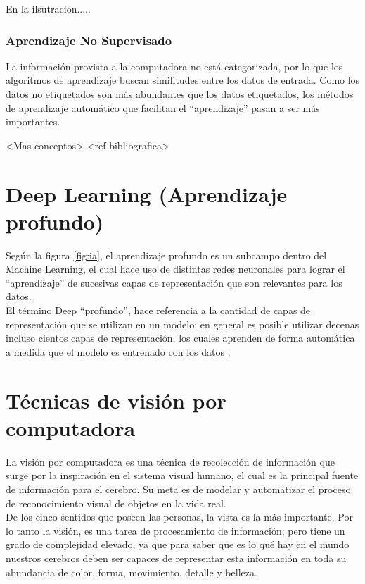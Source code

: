 En la ilsutracion.....

\subsubsection{Aprendizaje No Supervisado}
La información provista a la computadora no está categorizada, por lo que los algoritmos de aprendizaje buscan similitudes entre los datos de entrada. Como los datos no etiquetados son más abundantes que los datos etiquetados, los métodos de aprendizaje automático que facilitan el ``aprendizaje'' pasan a ser más importantes.\

<Mas conceptos> <ref bibliografica>

\section{Deep Learning (Aprendizaje profundo)}
Según la figura \ref{fig:ia}, el aprendizaje profundo es un subcampo dentro del Machine Learning, el cual hace uso de distintas redes neuronales para lograr el ``aprendizaje'' de sucesivas capas de representación que son relevantes para los datos.\\

El término Deep ``profundo'', hace referencia a la cantidad de capas de representación que se utilizan en un modelo; en general es posible utilizar decenas incluso cientos capas de representación, los cuales aprenden de forma automática a medida que el modelo es entrenado con los datos \cite{iaarbook:artificialvision}.

\section{Técnicas de visión por computadora}
La visión por computadora es una técnica de recolección de información que surge por la inspiración en el sistema visual humano, el cual es la principal fuente de información para el cerebro. Su meta es de modelar y automatizar el proceso de reconocimiento visual de objetos en la vida real.\\

De los cinco sentidos que poseen las personas, la vista es la más importante. Por lo tanto la visión, es una tarea de procesamiento de información; pero tiene un grado de complejidad elevado, ya que para saber que es lo qué hay en el mundo nuestros cerebros deben ser capaces de representar esta información en toda su abundancia de color, forma, movimiento, detalle y belleza. \cite{iaarbook:artificialvision}\\

